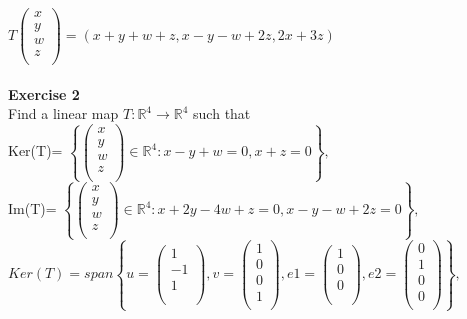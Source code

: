\documentclass[12pt]{amsart}
\begin{document}
$T\begin{pmatrix}
x\\
y\\
w\\
z\\
\end{pmatrix} = (x+y+w+z, x-y-w+2z, 2x+3z)$\\
\\
\textbf{Exercise 2}\\
Find a linear map $T: \mathbb{R}^4 \rightarrow \mathbb{R}^4$ such that\\
Ker(T)= $\left\{\begin{pmatrix}
x\\
y\\
w\\
z\\
\end{pmatrix} \in \mathbb{R}^4: x-y+w=0, x+z=0\right\},$\\
Im(T)= $\left\{\begin{pmatrix}
x\\
y\\
w\\
z\\
\end{pmatrix} \in \mathbb{R}^4: x+2y-4w+z=0, x-y-w+2z=0\right\},$\\
$Ker(T)=span\left\{u=\begin{pmatrix}
1\\
-1\\
1\\
\\
\end{pmatrix}, v=\begin{pmatrix}
1\\
0\\
0\\
1\\
\end{pmatrix}, e1=\begin{pmatrix}
1\\
0\\
0\\
\\
\end{pmatrix}, e2=\begin{pmatrix}
0\\
1\\
0\\
0\\
\end{pmatrix}\right\},$\\
\end{document}
